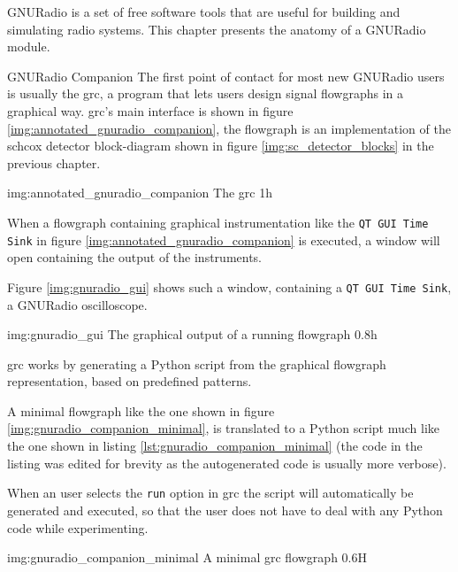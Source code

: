 GNURadio \cite{gnuradioweb} is a set of free software \cite{fsffreeweb}
tools that are useful for building and simulating radio systems.
This chapter presents the anatomy of a GNURadio module.

\begin{subchapter}{GNURadio Companion}
  The first point of contact for most new GNURadio users
  is usually the \gls{grc}, a program that lets
  users design signal flowgraphs in a graphical way.
  \Gls{grc}'s main interface is shown in figure
  \ref{img:annotated_gnuradio_companion}, the flowgraph
  is an implementation of the \acrlong{schcox} detector block-diagram
  shown in figure \ref{img:sc_detector_blocks} in the previous
  chapter.

               {img:annotated_gnuradio_companion}
               {The \acrlong{grc}}
               {1}{h}

  When a flowgraph containing graphical instrumentation like
  the \texttt{QT GUI Time Sink} in figure \ref{img:annotated_gnuradio_companion}
  is executed, a window will open containing the output of
  the instruments.

  Figure \ref{img:gnuradio_gui} shows such a window, containing
  a \texttt{QT GUI Time Sink}, a GNURadio oscilloscope.

                  {img:gnuradio_gui}
                  {The graphical output of a running flowgraph}
                  {0.8}{h}

  \Gls{grc} works by generating a Python script from the
  graphical flowgraph representation, based on predefined
  patterns.

  A minimal flowgraph like the one shown in figure
  \ref{img:gnuradio_companion_minimal}, is translated
  to a Python script much like the one shown in
  listing \ref{lst:gnuradio_companion_minimal}
  (the code in the listing was edited for brevity
  as the autogenerated code is usually more verbose).

  When an user selects the \texttt{run} option in \gls{grc}
  the script will automatically be generated and executed,
  so that the user does not have to deal with any Python
  code while experimenting.

                  {img:gnuradio_companion_minimal}
                  {A minimal \gls{grc} flowgraph}
                  {0.6}{H}
\end{subchapter}

